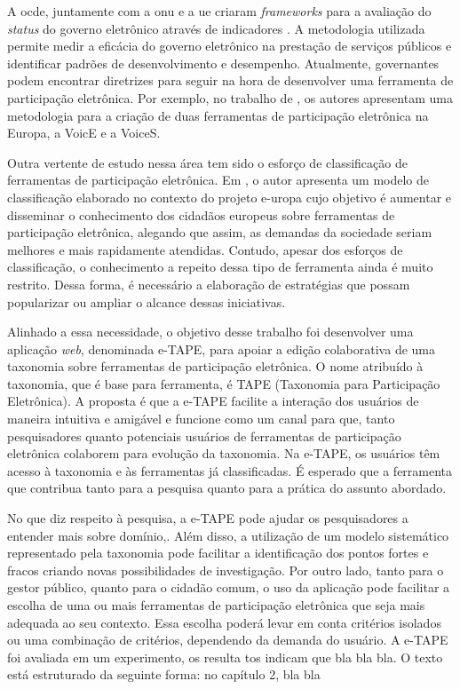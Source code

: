 \par
A \acrfull{ocde}, juntamente com a \acrshort{onu} e a \acrfull{ue} criaram \textit{frameworks} para a avaliação do \textit{status} do governo eletrônico através de indicadores \cite{onu2018}. A metodologia utilizada permite medir a eficácia do governo eletrônico na prestação de serviços públicos e identificar padrões de desenvolvimento e desempenho.
Atualmente, governantes podem encontrar diretrizes para seguir na hora de desenvolver uma ferramenta de participação eletrônica. 
Por exemplo,  no trabalho de , os autores apresentam uma metodologia para a criação de duas ferramentas de participação eletrônica na Europa, a VoicE e a VoiceS.

Outra vertente de estudo nessa área tem sido o esforço de classificação de ferramentas de participação eletrônica. Em  , o autor apresenta um modelo de classificação elaborado no contexto do projeto \acrfull{e-uropa} cujo objetivo é aumentar e disseminar o conhecimento dos cidadãos europeus sobre ferramentas de participação eletrônica, alegando que assim, as demandas da sociedade seriam melhores e mais rapidamente atendidas. Contudo, apesar dos esforços de classificação, o conhecimento a repeito dessa tipo de ferramenta ainda é muito restrito. Dessa forma, é necessário a elaboração de estratégias que possam popularizar ou ampliar o alcance dessas iniciativas. 
\par
Alinhado a essa necessidade, o objetivo desse trabalho foi desenvolver uma aplicação \textit{web}, denominada e-TAPE, para apoiar a edição colaborativa de uma taxonomia sobre ferramentas de participação eletrônica. O nome atribuído à taxonomia, que é base para ferramenta, é TAPE (Taxonomia para Participação Eletrônica). A proposta é que a e-TAPE facilite a interação dos usuários de maneira intuitiva e amigável e funcione como um canal para que, tanto pesquisadores quanto potenciais usuários de ferramentas de participação eletrônica colaborem para evolução da taxonomia. Na e-TAPE, os usuários têm acesso à taxonomia e às ferramentas já classificadas.
É esperado que a ferramenta que contribua tanto para a pesquisa quanto para a prática do assunto abordado. 
\par
No que diz respeito à pesquisa, a e-TAPE pode ajudar os pesquisadores a entender mais sobre domínio,. Além disso, a utilização de um modelo sistemático representado pela taxonomia pode facilitar a identificação dos pontos fortes e fracos criando novas possibilidades de investigação. Por outro lado, tanto para o gestor público, quanto para o cidadão comum, o uso da aplicação pode facilitar a escolha de uma ou mais ferramentas de participação eletrônica que seja mais adequada ao seu contexto. Essa escolha poderá levar em conta critérios isolados ou uma combinação de critérios, dependendo da demanda do usuário.
A e-TAPE foi avaliada em um experimento, os resulta tos indicam que bla bla bla. 
O texto está estruturado da seguinte forma: no capítulo 2, bla bla 
